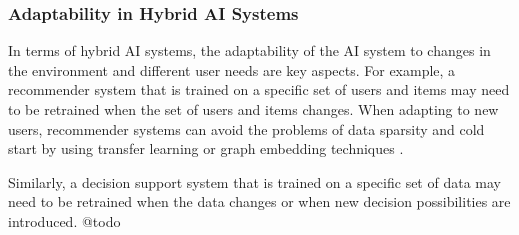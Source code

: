 \subsubsection{Adaptability in Hybrid AI Systems}

In terms of hybrid AI systems, the adaptability of the AI system to changes in the environment and different user needs are
key aspects. For example, a recommender system that is trained on a specific set of users and items may need to be retrained
when the set of users and items changes. When adapting to new users, recommender systems can avoid the problems of data sparsity
and cold start by using transfer learning or graph embedding techniques \citep{zhangArtificialIntelligenceRecommender2021,
dengRecommenderSystemsBased2022}.

Similarly, a decision support system that is trained on a specific set of data may
need to be retrained when the data changes or when new decision possibilities are introduced. {\color{purple} @todo}



